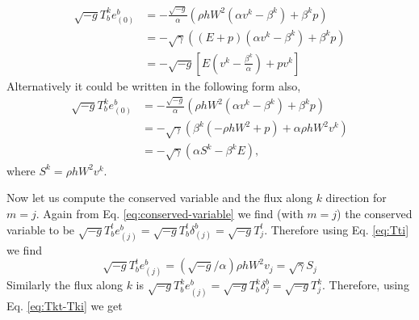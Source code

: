 \documentclass[10pt]{article}
\begin{document}
\begin{enumerate}
\begin{align}
  \label{eq:flux-tj-first-form}
  \sqrt{-g}T^k_b e^b_{(0)}
  & = - \frac{\sqrt{-g}}{\alpha}(\rho h W^2 (\alpha v^k - \beta^k) + \beta^k p) \\
  & = - \sqrt{\gamma}((E+p)(\alpha v^k - \beta^k) + \beta^k p)\\
  & =\boxed{-\sqrt{-g}\left[E\left(v^k - \frac{\beta^k}{\alpha}\right) + p v^k\right]}
\end{align}
Alternatively it could be written in the following form also,
\begin{align}
  \label{eq:flux-tj-final}
  \sqrt{-g}T^k_b e^b_{(0)}
  & = - \frac{\sqrt{-g}}{\alpha}(\rho h W^2 (\alpha v^k - \beta^k) + \beta^k p)\\
  & = - \sqrt{\gamma}(\beta^k(-\rho h W^2 + p) + \alpha \rho h W^2 v^k)\\
  & = \boxed{- \sqrt{\gamma}(\alpha S^k - \beta^k E)},
\end{align}
where $S^k = \rho h W^2 v^k$.

Now let us compute the conserved variable and the flux along $k$ direction for $m = j$. Again from Eq. \eqref{eq:conserved-variable} we find (with $m=j$) the conserved variable to be $\sqrt{-g}T^t_b e^b_{(j)} = \sqrt{-g}T^t_b \delta^b_{(j)} = \sqrt{-g}T^t_j$. Therefore using Eq. \eqref{eq:Tti} we find
\begin{equation}
  \label{eq:Conserved-variable-tj}
  \boxed{\sqrt{-g}T^t_b e^b_{(j)} = (\sqrt{-g}/\alpha)\rho h W^2 v_j = \sqrt{\gamma} S_j}
\end{equation}
Similarly the flux along $k$ is $\sqrt{-g}T^k_b e^b_{(j)} = \sqrt{-g}T^k_b \delta^b_j = \sqrt{-g}T^k_j$. Therefore, using Eq. \eqref{eq:Tkt-Tki} we get


\end{enumerate}
\end{document}
